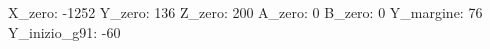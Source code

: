X_zero:     -1252
Y_zero:       136
Z_zero:       200
A_zero:         0
B_zero:         0
Y_margine:     76
Y_inizio_g91: -60